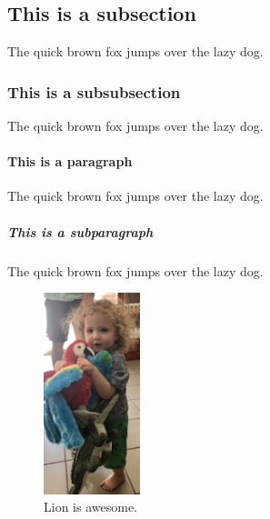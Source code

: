 \documentclass{article}
\begin{document}
\subsection{This is a subsection}
The quick brown fox jumps over the lazy dog.

\subsubsection{This is a subsubsection}
The quick brown fox jumps over the lazy dog.

\paragraph{This is a paragraph}
The quick brown fox jumps over the lazy dog.

\subparagraph{This is a subparagraph}
The quick brown fox jumps over the lazy dog.

\begin{figure}[h!!!]
\centering
\includegraphics[width=0.25\textwidth]{lion_parrots.JPG}
  \caption{Lion is awesome.}
\label{fig:lion}
\end{figure}
\eject
\end{document}
